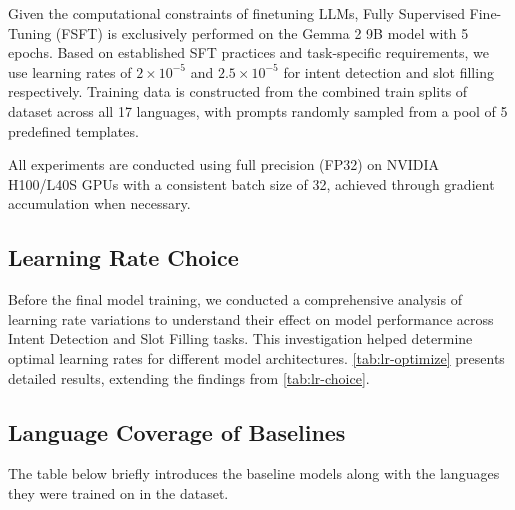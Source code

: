 Given the computational constraints of finetuning LLMs, Fully Supervised Fine-Tuning (FSFT) is exclusively performed on the Gemma 2 9B model with 5 epochs. Based on established SFT practices and task-specific requirements, we use learning rates of $2\times10^{-5}$ and $2.5\times10^{-5}$ for intent detection and slot filling respectively. Training data is constructed from the combined train splits of \dataset{} dataset across all 17 languages, with prompts randomly sampled from a pool of 5 predefined templates.

All experiments are conducted using full precision (FP32) on NVIDIA H100/L40S GPUs with a consistent batch size of 32, achieved through gradient accumulation when necessary. 

\subsection{Learning Rate Choice}
\label{sec:lr-impact}
Before the final model training, we conducted a comprehensive analysis of learning rate variations to understand their effect on model performance across Intent Detection and Slot Filling tasks. This investigation helped determine optimal learning rates for different model architectures. \autoref{tab:lr-optimize} presents detailed results, extending the findings from \autoref{tab:lr-choice}.

\begin{table}[h]
\centering
{}
\caption{Selected learning rates for different architectures of both tasks of intent detection and slot filling.}
\label{tab:lr-choice}
\end{table}
\vspace{-1em}


\subsection{Language Coverage of Baselines}
\label{app:language}
The table below briefly introduces the baseline models along with the languages they were trained on in the \dataset{} dataset.

